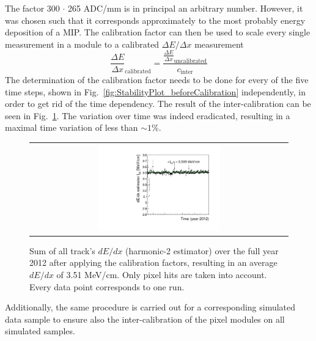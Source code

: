 The factor 300 $\cdot$ 265 ADC/mm is in principal an arbitrary number. 
However, it was chosen such that it corresponds approximately to the most probably energy deposition of a MIP.
The calibration factor can then be used to scale every single measurement in a module to a calibrated $\Delta E/\Delta x$ measurement
\begin{equation*}
\frac{\Delta E}{\Delta x}_{\text{calibrated}}=\frac{\frac{\Delta E}{\Delta x}_{\text{uncalibrated}}}{c_{\text{inter}}}
\end{equation*}
The determination of the calibration factor needs to be done for every of the five time steps, shown in Fig.~\ref{fig:StabilityPlot_beforeCalibration} independently, in order to get rid of the time dependency. 
The result of the inter-calibration can be seen in Fig.~\ref{fig:StabilityPlot_afterCalibration}.
The variation over time was indeed eradicated, resulting in a maximal time variation of less than $\sim1$\%.
\begin{figure}[!bt]
  \centering 
  \begin{tabular}{c}
  \includegraphics[width=0.49\textwidth]{figures/analysis/StabilityPlot_Pixel_afterCalibration_withoutStepFits_NEW.pdf}
  \end{tabular}
  \caption{Sum of all track's $dE/dx$ (harmonic-2 estimator) over the full year 2012 after applying the calibration factors, resulting in an average $dE/dx$ of 3.51 MeV/cm. Only pixel hits are taken into account. Every data point corresponds to one run.} 
  \label{fig:StabilityPlot_afterCalibration}
\end{figure}

Additionally, the same procedure is carried out for a corresponding simulated data sample to ensure also the inter-calibration of the pixel modules on all simulated samples.




